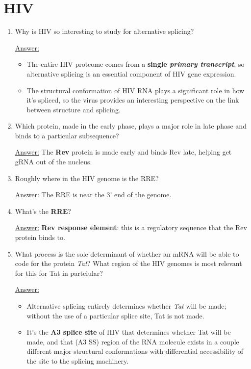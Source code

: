 \documentclass{article}
\newenvironment{QandA}{\begin{enumerate}[label=\bfseries Q\arabic*.]}
                       {\end{enumerate}}
\newenvironment{answered}{\par\normalfont\underline{Answer:}}{}
\begin{document}
\section{HIV}
\begin{QandA}
  \item{Why is HIV so interesting to study for alternative splicing?}
    \begin{answered}
    \begin{itemize}
      \item{The entire HIV proteome comes from a \textbf{single \textit{primary transcript}}, so alternative splicing is an essential component of HIV gene expression.}
      \item{The structural conformation of HIV RNA plays a significant role in how it's spliced, so the virus provides an interesting perspective on the link between structure and splicing.}
    \end{itemize}
    \end{answered}
  \item{Which protein, made in the early phase, plays a major role in late phase and binds to a particular subsequence?}
    \begin{answered}
    The \textbf{Rev} protein is made early and binds Rev late, helping get gRNA out of the nucleus.
    \end{answered}
  \item{Roughly where in the HIV genome is the RRE?}
    \begin{answered}
    The RRE is near the 3' end of the genome.
    \end{answered}
  \item{What's the \textbf{RRE}?}
    \begin{answered}
    \textbf{Rev response element}: this is a regulatory sequence that the Rev protein binds to.
    \end{answered}
  \item{What process is the sole determinant of whether an mRNA will be able to code for the protein \textit{Tat}? What region of the HIV genomes is most relevant for this for Tat in partciular?}
    \begin{answered}
    \begin{itemize}
      \item{Alternative splicing entirely determines whether \textit{Tat} will be made; without the use of a particular splice site, Tat is not made.}
      \item{It's the \textbf{A3 splice site} of HIV that determines whether Tat will be made, and that (A3 SS) region of the RNA molecule exists in a couple different major structural conformations with differential accessibility of the site to the splicing machinery.}

\end{itemize}
\end{answered}
\end{QandA}
\end{document}
